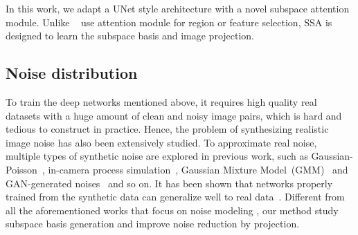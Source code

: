 \documentclass[final]{cvpr}
\begin{document}
In this work, we adapt a UNet style architecture with a novel subspace attention module. Unlike ~\cite{anwar2019ridnet, Anwar2020IERD,tian2020attention} use attention module for region or feature selection, SSA is designed to learn the subspace basis and image projection. 



\subsection{Noise distribution}

To train the deep networks mentioned above, it requires high quality real datasets with a huge amount of clean and noisy image pairs, which is hard and  tedious to construct in practice. Hence, the problem of synthesizing realistic image noise has also been extensively studied.  To approximate real noise, multiple types of synthetic noise are explored in previous work, such as Gaussian-Poisson~\cite{foi2008practical,liu2014practical}, in-camera process simulation~\cite{liu2008automatic,guo2018toward}, Gaussian Mixture Model~(GMM)~\cite{zhu2016noise} and GAN-generated noises~\cite{chen2018image} and so on. It has been shown that networks properly trained from the synthetic data can generalize well to real data~\cite{zhou2019awgn,brooks2019unprocessing,PDRID}. Different from all the aforementioned works that focus on noise modeling , our method study subspace basis generation and improve noise reduction by projection. 
\end{document}
